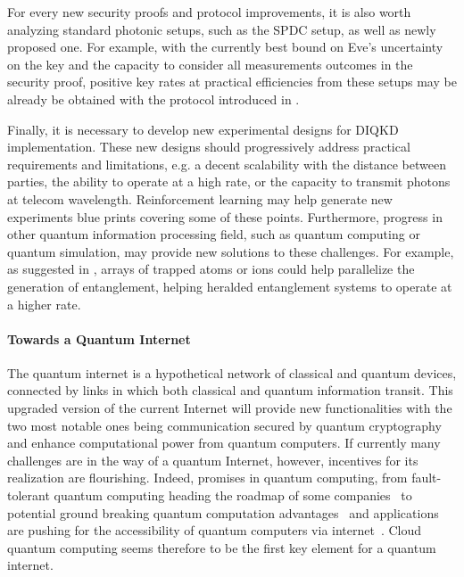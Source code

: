 \medbreak

For every new security proofs and protocol improvements, it is also worth analyzing standard photonic setups, such as the SPDC setup, as well as newly proposed one.
For example, with the currently best bound on Eve's uncertainty on the key and the capacity to consider all measurements outcomes in the security proof, positive key rates at practical efficiencies from these setups may be already be obtained with the protocol introduced in \cite{Brown2021}.


\medbreak 

Finally, it is necessary to develop new experimental designs for DIQKD implementation.
These new designs should progressively address practical requirements and limitations, e.g. a decent scalability with the distance between parties, the ability to operate at a high rate, or the capacity to transmit photons at telecom wavelength.
Reinforcement learning may help generate new experiments blue prints covering some of these points.
Furthermore, progress in other quantum information processing field, such as quantum computing or quantum simulation, may provide new solutions to these challenges.
For example, as suggested in \cite{Zapatero2023}, arrays of trapped atoms or ions could help parallelize the generation of entanglement, helping heralded entanglement systems to operate at a higher rate.

\paragraph{Towards a Quantum Internet}

The quantum internet is a hypothetical network of classical and quantum devices, connected by links in which both classical and quantum information transit.
This upgraded version of the current Internet will provide new functionalities with the two most notable ones being communication secured by quantum cryptography and enhance computational power from quantum computers.
If currently many challenges are in the way of a quantum Internet, however, incentives for its realization are flourishing.
Indeed, promises in quantum computing, from fault-tolerant quantum computing heading the roadmap of some companies~\cite{Google2022,Intel2022,IBM2022} to potential ground breaking quantum computation advantages~\cite{Deutsch1992,Shor1994,Grover1996} and applications~\cite{Bauer2020,Paudel2022} are pushing for the accessibility of quantum computers via internet~\cite{Rietsche2022}.
Cloud quantum computing seems therefore to be the first key element for a quantum internet.

